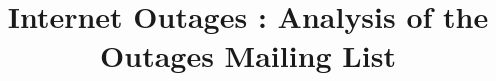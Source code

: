 \documentclass{sig-alternate}
\begin{document}
%

\title{{\ttlit Internet Outages} : Analysis of the Outages Mailing List}
%
%
%
%
%
\end{document}
